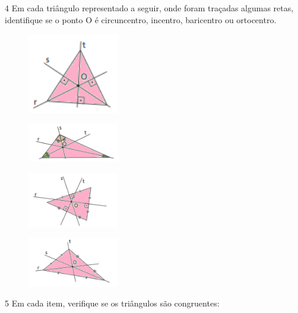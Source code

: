 {{\pagebreak
\num{4} Em cada triângulo representado a seguir, onde foram traçadas algumas
retas, identifique se o ponto O é circuncentro, incentro, baricentro ou
ortocentro.
\begin{multicols}{2}
\begin{escolha}
\item
\begin{figure}[H]
\centering\includegraphics[width=4cm]{./imgSAEB_8_MAT/media/image15.png}
\end{figure} 
\item
\begin{figure}[H]
\centering\includegraphics[width=4cm]{./imgSAEB_8_MAT/media/image16.png}
\end{figure} 
\item
\begin{figure}[H]
\centering\includegraphics[width=4cm]{./imgSAEB_8_MAT/media/image17.png}
\end{figure} 
\item
\begin{figure}[H]
\centering\includegraphics[width=4cm]{./imgSAEB_8_MAT/media/image18.png}
\end{figure} 
\end{escolha}
\end{multicols}


\num{5} Em cada item, verifique se os triângulos são congruentes:


}}
